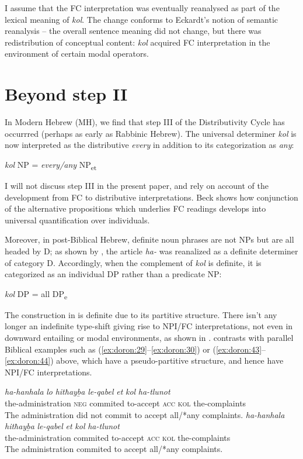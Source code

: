 \documentclass[output=paper]{langsci/langscibook}
\begin{document}
I assume that the FC interpretation was eventually reanalysed as part of the lexical meaning of \textit{kol}. The change conforms to Eckardt's \citeyearpar[236]{Eckardt2006} notion of semantic reanalysis – the overall sentence meaning did not change, but there was redistribution of conceptual content: \textit{kol} acquired FC interpretation in the environment of certain modal operators.

\section{Beyond step II}\label{sec:doron:6}%

In Modern Hebrew (MH), we find that step III of the Distributivity Cycle has occurrred (perhaps as early as Rabbinic Hebrew). The universal determiner \textit{kol} is now interpreted as the distributive \textit{every} in addition to its categorization as \textit{any}:

\ea%
    \label{ex:doron:56}
    \textit{kol} NP  =  \textit{every/any}   NP\textsubscript{et}
\z

I will not discuss step III in the present paper, and rely on  account of the development from FC to distributive interpretations. Beck shows how conjunction of the alternative propositions which underlies FC readings develops into universal quantification over individuals.

Moreover, in post-Biblical Hebrew, definite noun phrases are not NPs but are all headed by D; as shown by \citet{DoronMeir2016}, the article \textit{ha-} was reanalized as a definite determiner of category D. Accordingly, when the complement of \textit{kol} is definite, it is categorized as an individual DP rather than a predicate NP:

\ea%
    \label{ex:doron:57}
    \textit{kol} DP  =  all  DP\textsubscript{e}
\z

The construction in  is definite due to its partitive structure. There isn’t any longer an indefinite type-shift  giving rise to NPI/FC interpretations, not even in downward entailing or modal environments, as shown in .   contrasts with parallel Biblical examples such as (\ref{ex:doron:29}--\ref{ex:doron:30}) or (\ref{ex:doron:43}--\ref{ex:doron:44}) above, which have a pseudo-partitive structure, and hence have NPI/FC interpretations.

\ea%
    \label{ex:doron:58}
    \ea
    \gll \textit{ha-hanhala}            \textit{lo}     \textit{hitħayḇa}   \textit{le-qabel}     \textit{et}    \textit{kol}    \textit{ha-tlunot} \\
         the-administration \textsc{neg} commited  to-accept  \textsc{acc} \textsc{kol}  the-complaints  \\
    \glt The administration did not commit to accept all/*any complaints.
    \ex
    \gll \textit{ha-hanhala}            \textit{hitħayḇa}    \textit{le-qabel}     \textit{et}    \textit{kol}   \textit{ha-tlunot}           \\
         the-administration commited  to-accept  \textsc{acc} \textsc{kol}  the-complaints  \\
    \glt The administration commited to accept all/*any complaints.
    \z
\z
\end{document}

